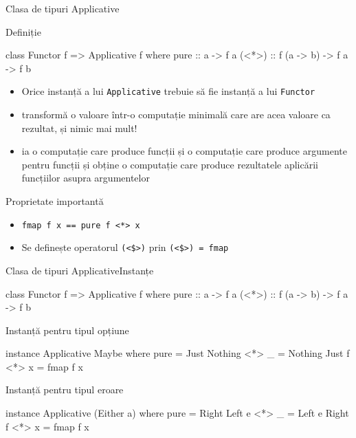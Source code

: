 \documentclass[xcolor=pdftex,romanian,colorlinks]{beamer}
\begin{document}
\begin{frame}[fragile]{Clasa de tipuri Applicative}
\begin{block}{Definiție}{}
\vspace{-2ex}
\begin{asciihs}
class Functor f => Applicative f where
   pure :: a -> f a
  (<*>) :: f (a -> b) -> f a -> f b
\end{asciihs}

\begin{itemize}
\item Orice instanță a lui \lstinline$Applicative$ trebuie să fie instanță a lui \lstinline$Functor$
\item {} transformă o valoare într-o computație minimală care are acea valoare ca rezultat, și nimic mai mult!
\item \structure{\lstinline$(<*>)$} ia o computație care produce funcții și o computație care produce argumente pentru funcții și obține  o computație care produce rezultatele aplicării funcțiilor asupra argumentelor
\end{itemize}
\end{block}

\begin{block}{Proprietate importantă}
\begin{itemize}
\item \lstinline$fmap f x == pure f <*> x$

\item Se definește operatorul \lstinline"(<$>)" prin  \lstinline"(<$>) = fmap"
\end{itemize}
\end{block}

\end{frame}

\begin{frame}[fragile]{Clasa de tipuri Applicative}{Instanțe}
\begin{asciihs}
class Functor f => Applicative f where
   pure :: a -> f a
  (<*>) :: f (a -> b) -> f a -> f b
\end{asciihs}

\begin{block}{Instanță pentru tipul opțiune}
\vspace{-2ex}
\begin{asciihs}
instance Applicative Maybe where
  pure = Just
  Nothing <*> _ = Nothing
  Just f  <*> x = fmap f x
\end{asciihs}
\end{block}

\begin{block}{Instanță pentru tipul eroare}
\vspace{-2ex}
\begin{asciihs}
instance Applicative (Either a) where
  pure = Right
  Left e <*> _ = Left e
  Right f  <*> x = fmap f x
\end{asciihs}
\end{block}
\end{frame}
\end{document}
